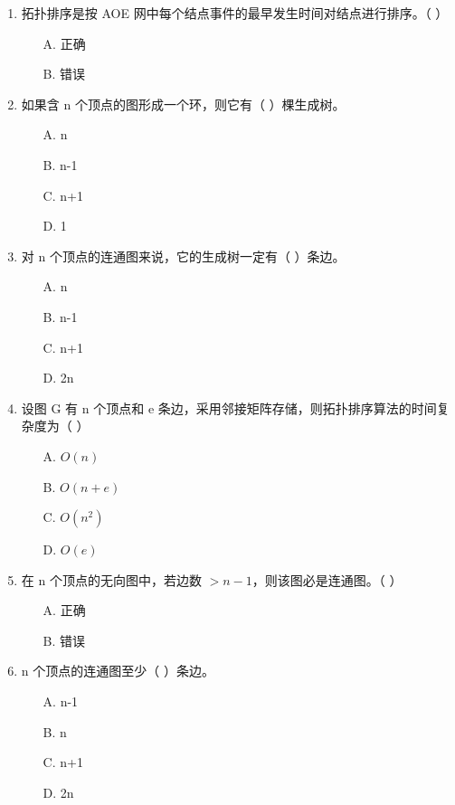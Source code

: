 \documentclass[12pt, a4paper]{article}
\begin{document}
\begin{enumerate}[label=\arabic*.]
	\item 拓扑排序是按 AOE 网中每个结点事件的最早发生时间对结点进行排序。（ ）
	      \begin{enumerate}
		      \item[A.] 正确
		      \item[B.] 错误
	      \end{enumerate}

	\item 如果含 n 个顶点的图形成一个环，则它有（ ）棵生成树。
	      \begin{enumerate}
		      \item[A.] n
		      \item[B.] n-1
		      \item[C.] n+1
		      \item[D.] 1
	      \end{enumerate}

	\item 对 n 个顶点的连通图来说，它的生成树一定有（ ）条边。
	      \begin{enumerate}
		      \item[A.] n
		      \item[B.] n-1
		      \item[C.] n+1
		      \item[D.] 2n
	      \end{enumerate}

	\item 设图 G 有 n 个顶点和 e 条边，采用邻接矩阵存储，则拓扑排序算法的时间复杂度为（ ）
	      \begin{enumerate}
		      \item[A.] $O(n)$
		      \item[B.] $O(n+e)$
		      \item[C.] $O(n^2)$
		      \item[D.] $O(e)$
	      \end{enumerate}

	\item 在 n 个顶点的无向图中，若边数 $>n-1$，则该图必是连通图。（ ）
	      \begin{enumerate}
		      \item[A.] 正确
		      \item[B.] 错误
	      \end{enumerate}

	\item n 个顶点的连通图至少（ ）条边。
	      \begin{enumerate}
		      \item[A.] n-1
		      \item[B.] n
		      \item[C.] n+1
		      \item[D.] 2n
	      \end{enumerate}


\end{enumerate}
\end{document}
